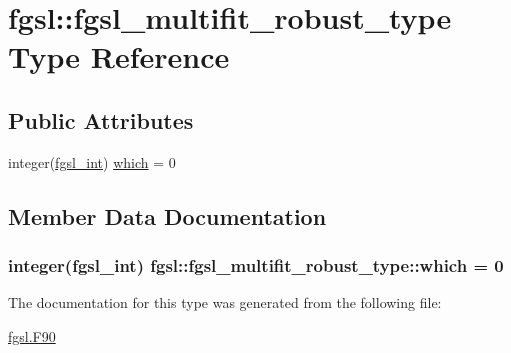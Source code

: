 \hypertarget{structfgsl_1_1fgsl__multifit__robust__type}{}\section{fgsl\+:\+:fgsl\+\_\+multifit\+\_\+robust\+\_\+type Type Reference}
\label{structfgsl_1_1fgsl__multifit__robust__type}
\subsection*{Public Attributes}
\begin{DoxyCompactItemize}
\item 
integer(\hyperlink{namespacefgsl_a222deda1d7a0c0e845ce4a683318efeb}{fgsl\+\_\+int}) \hyperlink{structfgsl_1_1fgsl__multifit__robust__type_ae436e39370cab414b168cea8be3b534e}{which} = 0
\end{DoxyCompactItemize}


\subsection{Member Data Documentation}
\hypertarget{structfgsl_1_1fgsl__multifit__robust__type_ae436e39370cab414b168cea8be3b534e}{}
\subsubsection[{which}]{\setlength{\rightskip}{0pt plus 5cm}integer({\bf fgsl\+\_\+int}) fgsl\+::fgsl\+\_\+multifit\+\_\+robust\+\_\+type\+::which = 0}\label{structfgsl_1_1fgsl__multifit__robust__type_ae436e39370cab414b168cea8be3b534e}


The documentation for this type was generated from the following file\+:\begin{DoxyCompactItemize}
\item 
\hyperlink{fgsl_8F90}{fgsl.\+F90}\end{DoxyCompactItemize}
